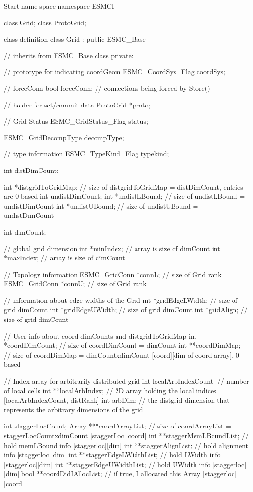    Start name space
 namespace ESMCI {  
 
 class Grid;
 class ProtoGrid;
 
   class definition
 class Grid : public ESMC_Base {    // inherits from ESMC_Base class
   private:
 
   // prototype for indicating coordGeom
   ESMC_CoordSys_Flag coordSys;
 
   // forceConn
   bool forceConn; // connections being forced by Store()
  
   // holder for set/commit data
   ProtoGrid *proto;
 
   // Grid Status
   ESMC_GridStatus_Flag status;
 
   ESMC_GridDecompType decompType;
 
   // type information
   ESMC_TypeKind_Flag typekind;
 
   int distDimCount;
 
   int *distgridToGridMap;    // size of distgridToGridMap = distDimCount, entries are 0-based
   int undistDimCount;
   int *undistLBound; // size of undistLBound = undistDimCount
   int *undistUBound; // size of undistUBound = undistDimCount
   
   int dimCount;
 
   // global grid dimension
   int *minIndex;  // array is size of dimCount
   int *maxIndex;  // array is size of dimCount
  
   // Topology information
   ESMC_GridConn *connL;  // size of Grid rank
   ESMC_GridConn *connU;  // size of Grid rank
   
   // information about edge widths of the Grid
   int *gridEdgeLWidth; // size of grid dimCount
   int *gridEdgeUWidth; // size of grid dimCount
   int *gridAlign; // size of grid dimCount
 
   // User info about coord dimCounts and distgridToGridMap
   int *coordDimCount; // size of coordDimCount = dimCount
   int **coordDimMap; // size of coordDimMap = dimCountxdimCount  [coord][dim of coord array], 0-based
 
   // Index array for arbitrarily distributed grid
   int localArbIndexCount;   // number of local cells
   int **localArbIndex;  // 2D array holding the local indices [localArbIndexCount, distRank]
   int arbDim;       // the distgrid dimension that represents the arbitrary dimensions of the grid
 
   int staggerLocCount;
   Array ***coordArrayList; // size of coordArrayList = staggerLocCountxdimCount [staggerLoc][coord]
   int   **staggerMemLBoundList;     // hold memLBound info [staggerloc][dim]
   int   **staggerAlignList;     // hold alignment info [staggerloc][dim]
   int   **staggerEdgeLWidthList;     // hold LWidth info [staggerloc][dim]
   int   **staggerEdgeUWidthList;     // hold UWidth info [staggerloc][dim]
   bool  **coordDidIAllocList;        // if true, I allocated this Array [staggerloc][coord]
 
}}
